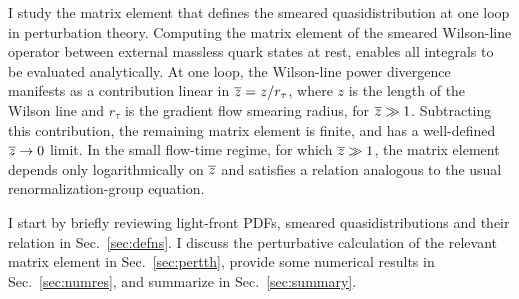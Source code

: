 I study the matrix element that defines the smeared quasidistribution at one loop in perturbation theory. Computing the matrix element of the smeared Wilson-line operator between external massless quark states at rest, enables all integrals to be evaluated analytically. At one loop, the Wilson-line power divergence manifests as a contribution linear in $\overline{z} = z/r_\tau$, where $z$ is the length of the Wilson line and $r_\tau$ is the gradient flow smearing radius, for $\overline{z} \gg 1$. Subtracting this contribution, the remaining matrix element is finite, and has a well-defined $\overline{z}\to0$ limit. In the small flow-time regime, for which $\overline{z} \gg 1$, the matrix element depends only logarithmically on $\overline{z}$ and satisfies a relation analogous to the usual renormalization-group equation.

I start by briefly reviewing light-front PDFs, smeared quasidistributions and their relation in Sec.~\ref{sec:defns}. I discuss the perturbative calculation of the relevant matrix element in Sec.~\ref{sec:pertth}, provide some numerical results in Sec.~\ref{sec:numres}, and summarize in Sec.~\ref{sec:summary}.
